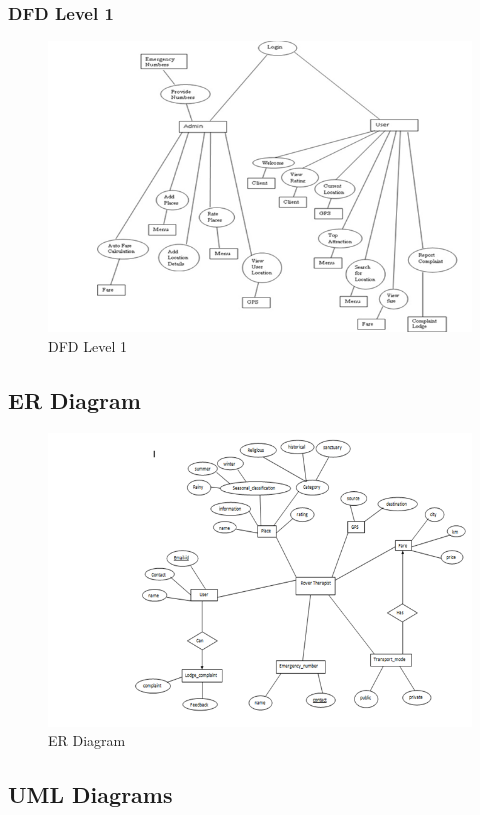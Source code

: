 \documentclass[12pt,a4paper]{article}
\begin{document}
{{{{{{\subsubsection{DFD Level 1}
\begin{figure}[!htb]
\centering
\includegraphics[width=15 cm]{levell}
\caption{DFD Level 1}
\end{figure}
\newpage
\subsection{ER Diagram}
\begin{figure}[!htb]
\centering
\includegraphics[width=12 cm]{er}
\caption{ER Diagram}
\end{figure}
\newpage
\subsection{UML Diagrams}
}}}}}}
\end{document}
